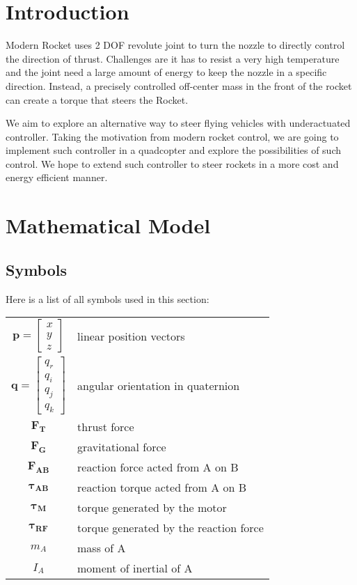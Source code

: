 \section{Introduction}
  Modern Rocket uses 2 DOF revolute joint to turn the nozzle to directly control the direction of thrust. Challenges are it has to resist a very high temperature and the joint need a large amount of energy to keep the nozzle in a specific direction. Instead, a precisely controlled off-center mass in the front of the rocket can create a torque that steers the Rocket. \par
  We aim to explore an alternative way to steer flying vehicles with underactuated controller. Taking the motivation from modern rocket control, we are going to implement such controller in a quadcopter and explore the possibilities of such control. We hope to extend such controller to steer rockets in a more cost and energy efficient manner.
\section{Mathematical Model}
\subsection{Symbols}
Here is a list of all symbols used in this section:
\\
\begin{tabular}{c p{}}
  $\bm{p} = \begin{bmatrix}x \\ y \\ z \end{bmatrix}$ & linear position vectors \\
  $\bm{q} = \begin{bmatrix} q_r \\ q_i \\ q_j \\ q_k \end{bmatrix}$ & angular orientation in quaternion \\
  $\bm{F_{T}}$ & thrust force \\
  $\bm{F_{G}}$ & gravitational force \\  
  $\bm{F_{AB}}$ & reaction force acted from A on B \\
  $\bm{\tau_{AB}}$ & reaction torque acted from A on B \\
  $\bm{\tau_{M}}$ & torque generated by the motor \\
  $\bm{\tau_{RF}}$ & torque generated by the reaction force \\  
  $m_A$ & mass of A \\
  $I_A$ & moment of inertial of A \\
\end{tabular}\\
